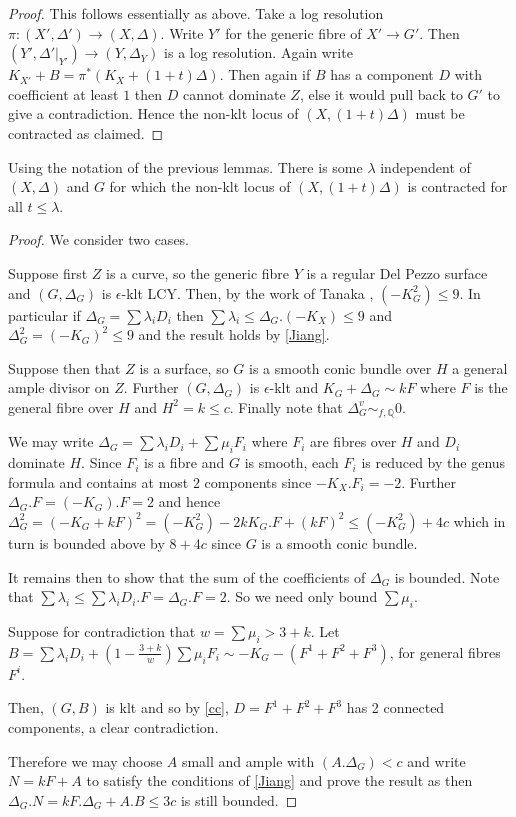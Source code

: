 \documentclass[a4paper,12pt]{book}
\begin{document}
\begin{proof}
	This follows essentially as above.
	Take a log resolution $\pi\colon (X',\Delta') \to (X,\Delta)$. Write $Y'$ for the generic fibre of $X' \to G'$. Then $(Y',\Delta'|_{Y'}) \to (Y,\Delta_{Y})$ is a log resolution. Again write $K_{X'}+B=\pi^{*}(K_{X}+(1+t)\Delta)$. Then again if $B$ has a component $D$ with coefficient at least $1$ then $D$ cannot dominate $Z$, else it would pull back to $G'$ to give a contradiction. Hence the non-klt locus of $(X,(1+t)\Delta)$ must be contracted as claimed. 
\end{proof}

\begin{lemma}
	Using the notation of the previous lemmas. There is some $\lambda$ independent of $(X,\Delta)$ and $G$ for which the non-klt locus of $(X,(1+t)\Delta)$ is contracted for all $t \leq \lambda$.
\end{lemma}
\begin{proof}
	We consider two cases. 
	
	Suppose first $Z$ is a curve, so the generic fibre $Y$ is a regular Del Pezzo surface and $(G,\Delta_{G})$ is $\epsilon$-klt LCY. Then, by the work of Tanaka \cite[Corollary 4.8]{tanaka2019boundedness}, $(-K_{G}^{2}) \leq 9$. In particular if $\Delta_{G}=\sum \lambda_{i}D_{i}$ then $\sum \lambda_{i} \leq \Delta_{G}.(-K_{X}) \leq 9$ and $\Delta_{G}^{2} =(-K_{G})^{2} \leq 9$ and the result holds by \autoref{Jiang}. 

	Suppose then that $Z$ is a surface, so $G$ is a smooth conic bundle over $H$ a general ample divisor on $Z$. Further $(G,\Delta_{G})$ is $\epsilon$-klt and $K_{G}+\Delta_{G}\sim kF$ where $F$ is the general fibre over $H$ and $H^{2}=k \leq c$. Finally note that $\Delta_{G}^{v} \sim_{f,\mathbb{Q}} 0$.

	We may write $\Delta_{G}= \sum \lambda_{i}D_{i}+ \sum \mu_{i}F_{i}$ where $F_{i}$ are fibres over $H$ and $D_{i}$ dominate $H$. Since $F_{i}$ is a fibre and $G$ is smooth, each $F_{i}$ is reduced by the genus formula and contains at most $2$ components since $-K_{X}.F_{i}=-2$. Further $\Delta_{G}.F=(-K_{G}).F=2$ and hence $\Delta_{G}^{2}=(-K_{G}+kF)^{2}=(-K_{G}^{2})-2kK_{G}.F +(kF)^{2} \leq (-K_{G}^{2})+4c$ which in turn is bounded above by $8+4c$ since $G$ is a smooth conic bundle\cite[Proposition III.21]{beauville1996complex}. 
	
	It remains then to show that the sum of the coefficients of $\Delta_{G}$ is bounded. Note that $\sum \lambda_{i} \leq \sum \lambda_{i}D_{i}.F =\Delta_{G}.F =2$. So we need only bound $\sum \mu_{i}$.
	
	Suppose for contradiction that $w=\sum \mu_{i} >3 +k$. Let $B=\sum \lambda_{i}D_{i} +(1-\frac{3+k}{w})\sum \mu_{i}F_{i}  \sim -K_{G}-(F^{1}+F^{2}+F^{3})$, for general fibres $F^{i}$.
	
	Then, $(G,B)$ is klt and so by \autoref{cc}, $D=F^{1}+F^{2}+F^{3}$ has 2 connected components, a clear contradiction.
	
	Therefore we may choose $A$ small and ample with $(A.\Delta_{G})<c$ and write $N=kF+A$ to satisfy the conditions of \autoref{Jiang} and prove the result as then $\Delta_{G}.N=kF.\Delta_{G}+A.B\leq 3c$ is still bounded.
\end{proof}
\end{document}
